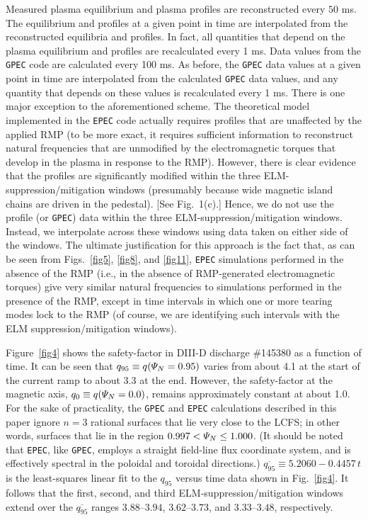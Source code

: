 \documentclass[12pt,prb,aps]{revtex4-1}
\begin{document}
Measured plasma equilibrium and
plasma profiles are reconstructed every $50$ ms. The equilibrium and profiles  at a given point in time are interpolated from
the reconstructed equilibria and profiles. In fact, all quantities that depend on the plasma equilibrium and profiles are recalculated every 1 ms.  Data values from the
{\tt GPEC} code are calculated every 100 ms. As before, the {\tt GPEC} data values at a given point in time are interpolated from the
calculated {\tt GPEC} data values, and any quantity that depends on these values is recalculated every 1 ms. There is one major exception to
the aforementioned scheme. The theoretical model implemented in the {\tt EPEC} code actually requires  profiles that are unaffected
by the applied RMP (to be more exact, it requires sufficient information to reconstruct  natural frequencies that are unmodified by the electromagnetic
torques that develop in the plasma in response to the RMP). However, there is clear evidence that the  profiles  are significantly modified
within the three ELM-suppression/mitigation windows (presumably because wide magnetic island chains are driven in the pedestal). [See Fig.~1(c).]
Hence, we do not use the  profile (or {\tt GPEC}) data within the three ELM-suppression/mitigation windows. Instead, we
interpolate across these windows using data taken on either side of the windows. The ultimate justification for this approach is the fact that, as can be seen from Figs.~\ref{fig5}, \ref{fig8}, and
\ref{fig11}, {\tt EPEC} simulations performed in the absence of the RMP (i.e., in the absence of RMP-generated electromagnetic torques) give very similar natural frequencies to simulations performed in the presence of the RMP, except
in time intervals in which one or more tearing modes lock to the RMP (of course, we are identifying such intervals with the ELM suppression/mitigation windows). 

Figure~\ref{fig4} shows the safety-factor in DIII-D discharge \#145380 as a function of time. It can be seen
that $q_{95}\equiv q({\mit\Psi}_N=0.95)$ varies from about 4.1 at the start of the current ramp to about 3.3
at the end. However, the safety-factor at the magnetic axis, $q_0 \equiv q({\mit\Psi}_N=0.0)$, remains approximately
constant at about 1.0. For the sake of practicality,  the {\tt GPEC} and {\tt EPEC} calculations described in this paper ignore $n=3$ rational
surfaces that lie very close to the LCFS; in other words,  surfaces that lie in the region $0.997 < {\mit\Psi}_N\leq 1.000$. (It should be
noted that {\tt EPEC}, like {\tt GPEC}, employs a straight field-line flux coordinate system, and is effectively
spectral in the poloidal and toroidal directions.)  $\overline{q_{95}}\equiv 5.2060-0.4457\,t$ is the
least-squares linear fit to the $q_{95}$ versus time data shown in Fig.~\ref{fig4}. 
It follows that the 
first, second, and third ELM-suppression/mitigation windows extend over the $\overline{q_{95}}$ ranges $3.88$--$3.94$, $3.62$--$3.73$,
and $3.33$--$3.48$, respectively. 
\end{document}
